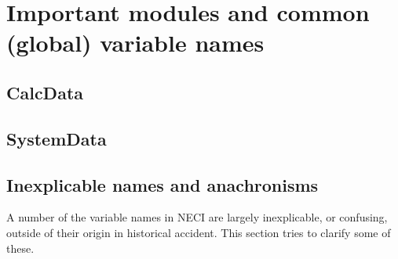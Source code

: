 \documentclass[a4paper,notitlepage]{scrreprt}
\begin{document}
\section{Important modules and common (global) variable names}
\label{sect:cons-types}

\subsection{\ttfamily CalcData}
\subsection{\ttfamily SystemData}

\subsection{Inexplicable names and anachronisms}
	A number of the variable names in NECI are largely inexplicable, or
	confusing, outside of their origin in historical accident. This section
	tries to clarify some of these.
\end{document}
